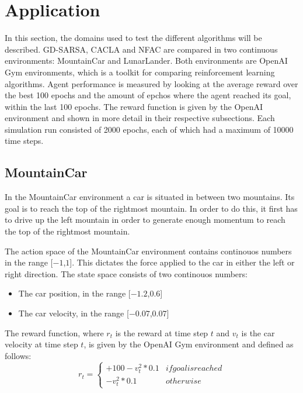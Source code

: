 
\section{Application}

In this section, the domains used to test the different algorithms will be described. GD-SARSA, CACLA and NFAC are compared in two continuous environments: MountainCar\cite{openaimountaincar} and LunarLander\cite{openailunarlander}. Both environments are OpenAI Gym environments\cite{openaigym}, which is a toolkit for comparing reinforcement learning algorithms.  Agent performance is measured by looking at the average reward over the best 100 epochs and the amount of epchos where the agent reached its goal, within the last 100 epochs. The reward function is given by the OpenAI environment and shown in more detail in their respective subsections. Each simulation run consisted of 2000 epochs, each of which had a maximum of 10000 time steps.



\subsection{MountainCar}
In the MountainCar environment a car is situated in between two mountains. Its goal is to reach the top of the rightmost mountain. In order to do this, it first has to drive up the left mountain in order to generate enough momentum to reach the top of the rightmost mountain. 

The action space of the MountainCar environment contains continouos numbers in the range [$-1$,$1$]. This dictates the force applied to the car in either the left or right direction. The state space consists of two continouos numbers:
\begin{itemize}
    \item[] The car position, in the range [$-1.2$,$0.6$]
    \item[] The car velocity, in the range [$-0.07$,$0.07$]
\end{itemize}

The reward function, where $r_t$ is the reward at time step $t$ and $v_t$ is the car velocity at time step $t$, is given by the OpenAI Gym environment and defined as follows:
\begin{equation}
    r_t =
    \begin{cases*}
      +100 -v_t^2 * 0.1 & if goal is reached \\
      -v_t^2 * 0.1 & otherwise
    \end{cases*}
\end{equation}

